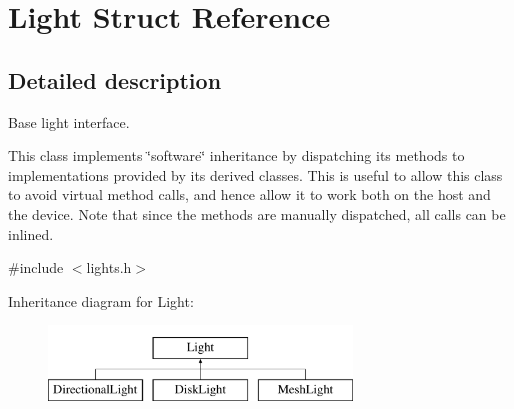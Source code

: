 \hypertarget{struct_light}{}\section{Light Struct Reference}
\label{struct_light}


\subsection{Detailed description}
Base light interface.

This class implements \char`\"{}software\char`\"{} inheritance by dispatching its methods to implementations provided by its derived classes. This is useful to allow this class to avoid virtual method calls, and hence allow it to work both on the host and the device. Note that since the methods are manually dispatched, all calls can be inlined. 

{\ttfamily \#include $<$lights.\+h$>$}

Inheritance diagram for Light\+:\begin{figure}[H]
\begin{center}
\leavevmode
\includegraphics[height=2.000000cm]{struct_light}
\end{center}
\end{figure}
